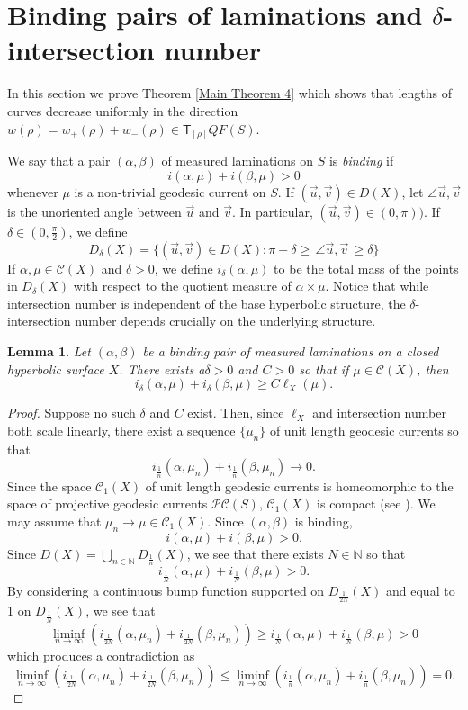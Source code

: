 \documentclass{amsart}
\theoremstyle{plain}
\newtheorem{lemma}[proposition]{Lemma}
\theoremstyle{definition}
\theoremstyle{remark}
\renewcommand{\sf}[1]{{\mathsf{#1}}}
\newcommand{\<}{\left <}
\renewcommand{\>}{\right >}
\begin{document}
\section{Binding pairs of laminations and $\delta$-intersection number}

In this section we prove Theorem \ref{Main Theorem 4} which shows that lengths of curves decrease uniformly
in the direction  $w(\rho)= w_+(\rho)+w_-(\rho)\in \sf T_{[\rho]}QF(S)$. 

We say that a pair $(\alpha,\beta)$ of measured laminations  on $S$ is {\em binding} if 
$$i(\alpha,\mu)+i(\beta,\mu)>0$$
whenever $\mu$ is a non-trivial geodesic current on $S$.
If $(\vec u,\vec v)\in D(X)$, let $\angle \vec u, \vec v$ is the unoriented angle between $\vec u$ and $\vec v$.
In particular, $(\vec u,\vec v)\in (0,\pi))$. If $\delta\in \left(0,\frac{\pi}{2}\right)$, we define
$$D_\delta(X)=\{(\vec u,\vec v)\in D(X) : \pi-\delta\ge\, \angle \vec u, \vec v\, \ge\delta\}$$
If $\alpha,\mu\in \mathcal C(X)$ and $\delta>0$, we define $i_\delta(\alpha,\mu)$ to be the total mass of the points in 
$D_\delta(X)$ with respect to the quotient measure of $\alpha\times\mu$. Notice that while intersection number is independent of
the base hyperbolic structure, the $\delta$-intersection number depends crucially on the underlying structure.

\begin{lemma}
\label{small enough delta}
Let  $(\alpha,\beta)$ be a binding pair of measured laminations on a closed hyperbolic surface $X$.
There exists a$\delta > 0$  and $C>0$ so that if $\mu\in\mathcal C(X)$, then
$$i_\delta(\alpha,\mu)+i_\delta(\beta,\mu) \geq C \ell_X(\mu).$$
\end{lemma} 

\begin{proof}
Suppose no such $\delta$ and $C$ exist. Then, since $\ell_X$ and intersection number both scale linearly,
there exist a sequence $\{\mu_n\}$ of unit length geodesic currents so that
$$i_{\frac{1}{n}}(\alpha,\mu_n)+i_{\frac{1}{n}}(\beta,\mu_n) \to 0.$$
Since the space  $\mathcal C_1(X)$ of unit length geodesic currents  is homeomorphic to the space of projective geodesic currents $\mathcal{PC}(S)$,  $\mathcal C_1(X)$ is compact (see \cite{bonahon-currents}). We may assume that
$\mu_n\to\mu\in\mathcal C_1(X)$. Since $(\alpha,\beta)$ is binding,
$$i(\alpha,\mu)+i(\beta,\mu)>0.$$
Since $D(X)=\bigcup_{n\in\mathbb N} D_{\frac{1}{n}}(X)$, we see
that there exists $N\in\mathbb N$ so that  
$$i_{\frac{1}{N}}(\alpha,\mu)+i_{\frac{1}{N}}(\beta,\mu) > 0.$$
By considering a continuous bump function supported on $D_{\frac{1}{2N}}(X)$ and equal to 1 on $D_{\frac{1}{N}}(X)$,
we see that 
$$\liminf_{n\rightarrow \infty} \left(i_{\frac{1}{2N}}(\alpha,\mu_n)+i_{\frac{1}{2N}}(\beta,\mu_n)\right) \ge i_{\frac{1}{N}}(\alpha,\mu)+i_{\frac{1}{N}}(\beta,\mu)>0$$ which produces a contradiction as
$$\liminf_{n\rightarrow \infty} \left(i_{\frac{1}{2N}}(\alpha,\mu_n)+i_{\frac{1}{2N}}(\beta,\mu_n)\right) \le \liminf_{n\rightarrow \infty}\left( i_{\frac{1}{n}}(\alpha,\mu_n)+i_{\frac{1}{n}}(\beta,\mu_n)\right) = 0.$$ 
\end{proof}
\end{document}
